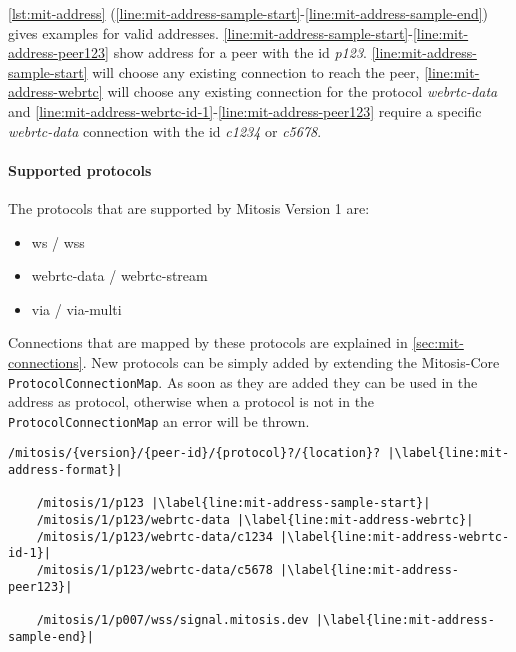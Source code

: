 \vref{lst:mit-address} (\cref{line:mit-address-sample-start}-\cref{line:mit-address-sample-end}) gives examples for valid addresses. \cref{line:mit-address-sample-start}-\cref{line:mit-address-peer123} show address for a peer with the id \textit{p123}. \cref{line:mit-address-sample-start} will choose any existing connection to reach the peer, \cref{line:mit-address-webrtc} will choose any existing connection for the protocol \textit{webrtc-data} and \cref{line:mit-address-webrtc-id-1}-\cref{line:mit-address-peer123} require a specific \textit{webrtc-data} connection with the id \textit{c1234} or \textit{c5678}.

\paragraph{Supported protocols}
The protocols that are supported by Mitosis Version 1 are:
\begin{itemize}
    \item ws / wss
    \item webrtc-data / webrtc-stream
    \item via / via-multi
\end{itemize}
Connections that are mapped by these protocols are explained in \vref{sec:mit-connections}.
New protocols can be simply added by extending the Mitosis-Core \lstinline|ProtocolConnectionMap|. As soon as they are added they can be used in the address as protocol, otherwise when a protocol is not in the \lstinline|ProtocolConnectionMap| an error will be thrown.

\begin{Listing}
\begin{lstlisting}[basicstyle=\footnotesize\ttfamily,xleftmargin=3em]
    /mitosis/{version}/{peer-id}/{protocol}?/{location}? |\label{line:mit-address-format}|
    
    /mitosis/1/p123 |\label{line:mit-address-sample-start}|
    /mitosis/1/p123/webrtc-data |\label{line:mit-address-webrtc}|
    /mitosis/1/p123/webrtc-data/c1234 |\label{line:mit-address-webrtc-id-1}|
    /mitosis/1/p123/webrtc-data/c5678 |\label{line:mit-address-peer123}|

    /mitosis/1/p007/wss/signal.mitosis.dev |\label{line:mit-address-sample-end}|
\end{lstlisting}
\label{lst:mit-address}
\caption{Mitosis address format and sample addresses}
\end{Listing}
